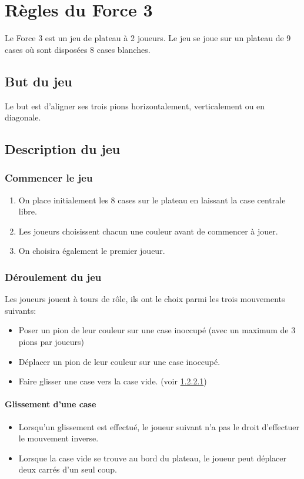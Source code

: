 \chapter{Règles du Force 3} \label{chapter:regles-force3}

Le Force 3 est un jeu de plateau à 2 joueurs.
Le jeu se joue sur un plateau de 9 cases où sont disposées 8 cases blanches.

\section{But du jeu}

Le but est d'aligner ses trois pions horizontalement, verticalement ou en
diagonale.

\section{Description du jeu}
\subsection{Commencer le jeu}

\begin{enumerate}
    \item On place initialement les 8 cases sur le plateau en laissant la case
    centrale libre.
    \item Les joueurs choisissent chacun une couleur avant de commencer à jouer.
    \item On choisira également le premier joueur.
\end{enumerate}

\subsection{Déroulement du jeu}

Les joueurs jouent à tours de rôle, ils ont le choix parmi les trois mouvements
suivants:
\begin{itemize}
    \item Poser un pion de leur couleur sur une case inoccupé (avec un maximum
    de 3 pions par joueurs)
    \item Déplacer un pion de leur couleur sur une case inoccupé.
    \item Faire glisser une case vers la case vide. (voir \ref{rules:glissement})
\end{itemize}


\subsubsection{Glissement d'une case} \label{rules:glissement}

\begin{itemize}
    \item Lorsqu'un glissement est effectué, le joueur suivant n'a pas le droit
    d'effectuer le mouvement inverse.
    \item Lorsque la case vide se trouve au bord du plateau, le joueur peut
    déplacer deux carrés d'un seul coup.
\end{itemize}
